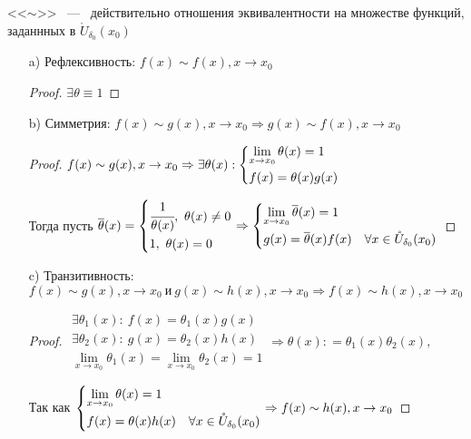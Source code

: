 \begin{note}
    <<$\sim$>> ~---~ действительно отношения эквивалентности на множестве функций, заданнных в $\mathring U_{\delta_{0}}(x_{0})$
    \begin{enumerate}
        \item[a)] Рефлексивность:  $f(x) \sim f(x), x\to x_{0}$ 
        
    \begin{proof}
        $\exists \theta \equiv 1 $
    \end{proof}
        \item[b)] Симметрия: $f(x) \sim g(x), x\to x_{0} \Rightarrow g(x) \sim f(x), x\to x_{0}$
    \begin{proof}
        $f(x) \sim g(x), x\to x_{0} \Rightarrow \exists \theta(x): \left\{ \begin{gathered}
        \lim\limits_{x \to x_{0}} \theta(x)= 1 \hfill \\
        f(x) = \theta(x) g(x) \hfill
        \end{gathered} \right.$ 

        Тогда пусть $\overline{\theta}(x) = \left\{ \begin{gathered}
            \cfrac{1}{\theta(x)}, \ \theta(x)\neq 0 \hfill \\
            1, \ \theta (x) =  0 \hfill
        \end{gathered} \right.
        \Rightarrow \left\{
        \begin{gathered}
        \lim\limits_{x\to x_{0}} \overline{\theta}(x) = 1 \hfill \\
        g(x) = \overline{\theta }(x) f(x) \quad \forall x\in \mathring{U}_{\delta_{0}}(x_{0}) 
        \end{gathered} \right.$
    \end{proof}
            \item[c)] Транзитивность: $f(x) \sim g(x), x\to x_{0} \ \textrm{и}\ g(x) \sim h(x),  x\to x_{0} \Rightarrow f(x) \sim h(x), x\to x_{0}$

    \begin{proof}
        $
        \begin{gathered}
            \exists \theta_{1}(x): \ f(x) = \theta_{1}(x) g(x) \\
            \exists \theta_{2}(x): \ g(x) = \theta_{2}(x) h(x) \\
            \lim\limits_{x \to x_{0}}\theta_{1}(x)= \lim\limits_{x \to x_{0}}\theta_{2}(x)= 1
        \end{gathered} 
        \Rightarrow \theta(x): = \theta_{1}(x)\theta_{2}(x),
        $
        
        Так как $
        \left\{ \begin{gathered}
        \lim\limits_{x \to x_{0}} \theta(x)= 1 \hfill \\
        f(x) = \theta(x) h(x) \quad \forall x\in \mathring{U}_{\delta_{0}}(x_{0})\hfill
        \end{gathered} \right.
        \Rightarrow
        f(x) \sim h(x), x\to x_{0}
        $      
    \end{proof}
    \end{enumerate}
\end{note}


